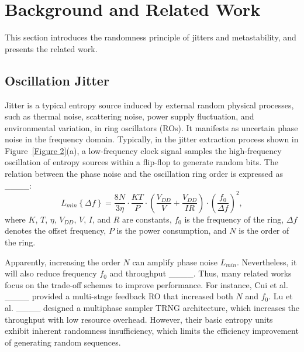 \section{Background and Related Work}
\label{Section: Background and related work}

This section introduces the randomness principle of jitters and metastability, and presents the related work.

\subsection{ Oscillation Jitter }
\label{Section: Oscillation Jitter}
Jitter is a typical entropy source induced by external random physical processes, such as thermal noise, scattering noise, power supply fluctuation, and environmental variation, in ring oscillators (ROs).
It manifests as uncertain phase noise in the frequency domain. Typically, in the jitter extraction process shown in Figure~\ref{Figure 2}(a), a low-frequency clock signal samples the high-frequency oscillation of entropy sources within a flip-flop to generate random bits. The relation between the phase noise and the oscillation ring order is expressed as ____:
\begin{equation}
L_{min}\left \{ \Delta f \right \} =\frac{8N}{3\eta }\cdot \frac{KT}{P}\cdot \left ( \frac{V_{DD} }{V} +\frac{V_{DD} }{IR}  \right )\cdot \left ( \frac{f_{0}}{\Delta f}  \right )  ^{2},
\end{equation}
where $K$, $T$, $\eta $, $V_{DD}$, $V$, $I$, and $R$ are constants, $f_{0}$ is the frequency of the ring, $\Delta f$ denotes the offset frequency, $P$ is the power consumption, and $N$ is the order of the ring. 

Apparently, increasing the order $N$ can amplify phase noise $L_{min}$. Nevertheless, it will also reduce frequency $f_{0}$ and throughput ____. Thus, many related works focus on the trade-off schemes to improve performance. For instance, Cui et al. ____ provided a multi-stage feedback RO that increased both $N$ and $f_{0}$. Lu et al. ____ designed a multiphase sampler TRNG architecture, which increases the throughput with low resource overhead. However, their basic entropy units exhibit inherent randomness insufficiency, which limits the efficiency improvement of generating random sequences. 


